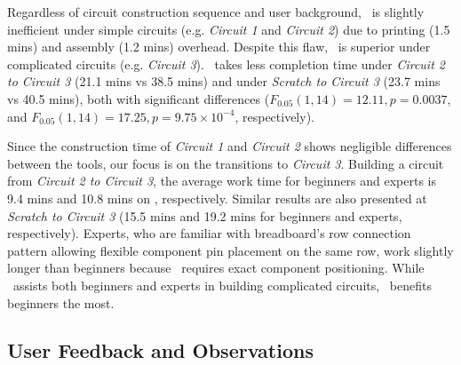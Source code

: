 Regardless of circuit construction sequence and user background, \papertitle\ is slightly inefficient under simple circuits (e.g. \textit{Circuit 1} and \textit{Circuit 2}) due to printing (1.5 mins) and assembly (1.2 mins) overhead. Despite this flaw, \papertitle\ is superior under complicated circuits (e.g. \textit{Circuit 3}). \papertitle\ takes less completion time under \textit{Circuit 2 to Circuit 3} (21.1 mins vs 38.5 mins) and under \textit{Scratch to Circuit 3} (23.7 mins vs 40.5 mins), both with significant differences ($F_{0.05} (1, 14) = 12.11, p = 0.0037$, and $F_{0.05} (1, 14) = 17.25, p = 9.75 \times 10^{-4}$, respectively).


Since the construction time of \textit{Circuit 1} and \textit{Circuit 2} shows negligible differences between the tools, our focus is on the transitions to \textit{Circuit 3}. Building a circuit from \textit{Circuit 2 to Circuit 3}, the average work time for beginners and experts is 9.4 mins and 10.8 mins on \papertitle, respectively. Similar results are also presented at \textit{Scratch to Circuit 3} (15.5 mins and 19.2 mins for beginners and experts, respectively). Experts, who are familiar with breadboard's row connection pattern allowing flexible component pin placement on the same row, work slightly longer than beginners because \papertitle\ requires exact component positioning. While \papertitle\ assists both beginners and experts in building complicated circuits, \papertitle\ benefits beginners the most.




\subsection{User Feedback and Observations}

